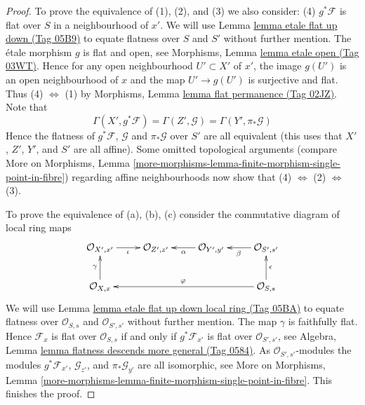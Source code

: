 \documentclass{amsart}
\theoremstyle{plain}
\theoremstyle{definition}
\theoremstyle{remark}
\numberwithin{equation}{subsection}
\begin{document}
\begin{proof}
To prove the equivalence of (1), (2), and (3) we also consider:
(4) $g^*\mathcal{F}$ is flat over $S$ in a neighbourhood of $x'$.
We will use
Lemma \href{https://stacks.math.columbia.edu/tag/05B9}{lemma etale flat up down (Tag 05B9)}
to equate flatness over $S$ and $S'$ without further mention.
The \'etale morphism $g$ is flat and open, see
Morphisms, Lemma \href{https://stacks.math.columbia.edu/tag/03WT}{lemma etale open (Tag 03WT)}.
Hence for any open neighbourhood $U' \subset X'$ of $x'$, the image
$g(U')$ is an open neighbourhood of $x$ and the map
$U' \to g(U')$ is surjective and flat.
Thus (4) $\Leftrightarrow$ (1) by
Morphisms, Lemma \href{https://stacks.math.columbia.edu/tag/02JZ}{lemma flat permanence (Tag 02JZ)}.
Note that
$$
\Gamma(X', g^*\mathcal{F}) =
\Gamma(Z', \mathcal{G}) =
\Gamma(Y', \pi_*\mathcal{G})
$$
Hence the flatness of $g^*\mathcal{F}$, $\mathcal{G}$ and $\pi_*\mathcal{G}$
over $S'$ are all equivalent (this uses that $X'$, $Z'$, $Y'$, and
$S'$ are all affine). Some omitted topological arguments (compare
More on Morphisms,
Lemma \ref{more-morphisms-lemma-finite-morphism-single-point-in-fibre})
regarding affine neighbourhoods now show that
(4) $\Leftrightarrow$ (2) $\Leftrightarrow$ (3).

\medskip\noindent
To prove the equivalence of (a), (b), (c) consider the commutative diagram
of local ring maps
$$
\xymatrix{
\mathcal{O}_{X', x'} \ar[r]_\iota &
\mathcal{O}_{Z', z'} &
\mathcal{O}_{Y', y'} \ar[l]^\alpha &
\mathcal{O}_{S', s'} \ar[l]^\beta \\
\mathcal{O}_{X, x} \ar[u]^\gamma & & &
\mathcal{O}_{S, s} \ar[lll]_\varphi \ar[u]_\epsilon
}
$$
We will use
Lemma \href{https://stacks.math.columbia.edu/tag/05BA}{lemma etale flat up down local ring (Tag 05BA)}
to equate flatness over $\mathcal{O}_{S, s}$ and $\mathcal{O}_{S', s'}$
without further mention.
The map $\gamma$ is faithfully flat. Hence
$\mathcal{F}_x$ is flat over $\mathcal{O}_{S, s}$
if and only if $g^*\mathcal{F}_{x'}$ is flat over
$\mathcal{O}_{S', s'}$, see
Algebra, Lemma \href{https://stacks.math.columbia.edu/tag/0584}{lemma flatness descends more general (Tag 0584)}.
As $\mathcal{O}_{S', s'}$-modules the modules
$g^*\mathcal{F}_{x'}$, $\mathcal{G}_{z'}$, and
$\pi_*\mathcal{G}_{y'}$ are all isomorphic, see
More on Morphisms,
Lemma \ref{more-morphisms-lemma-finite-morphism-single-point-in-fibre}.
This finishes the proof.
\end{proof}
\end{document}
